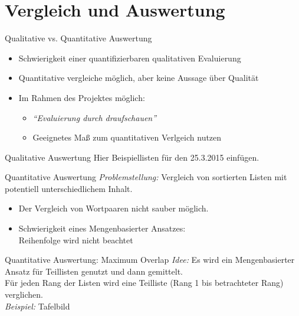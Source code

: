\documentclass{beamer}
\begin{document}
\section{Vergleich und Auswertung}
\begin{frame} \sectionpage \end{frame}
\begin{frame}{Qualitative vs. Quantitative Auswertung}
	\begin{itemize}
		\item{Schwierigkeit einer quantifizierbaren qualitativen Evaluierung}
		\item{Quantitative vergleiche m\"oglich, aber keine Aussage \"uber Qualit\"at}
		\item{Im Rahmen des Projektes m\"oglich:
			\begin{itemize}
				\item{\emph{``Evaluierung durch draufschauen''}}
				\item{Geeignetes Maß zum quantitativen Verlgeich nutzen}
			\end{itemize}
		}
	\end{itemize}
\end{frame}

\begin{frame}{Qualitative Auswertung}
Hier Beispiellisten f\"ur den 25.3.2015 einf\"ugen.
\end{frame}

\begin{frame}{Quantitative Auswertung}
	\emph{Problemstellung: }Vergleich von sortierten Listen mit potentiell unterschiedlichem Inhalt.
	\begin{itemize}
		\item{Der Vergleich von Wortpaaren nicht sauber m\"oglich.}
		\item{Schwierigkeit eines Mengenbasierter Ansatzes:\\Reihenfolge wird nicht beachtet }
	\end{itemize}	
\end{frame}


\begin{frame}{Quantitative Auswertung: Maximum Overlap}
	\emph{Idee: } Es wird ein Mengenbasierter Ansatz f\"ur Teillisten genutzt und dann gemittelt.\\
	F\"ur jeden Rang der Listen wird eine Teilliste (Rang 1 bis betrachteter Rang) verglichen.\\
	\vspace{1cm}
	\emph{Beispiel:} Tafelbild
\end{frame}
\end{document}
